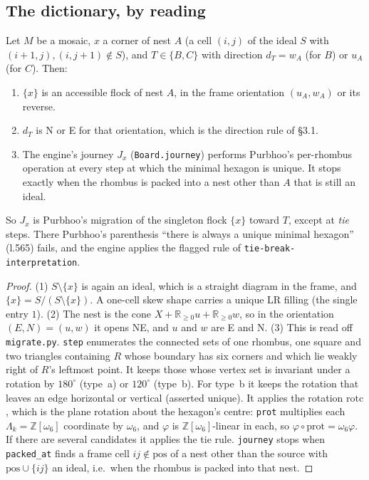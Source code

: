 \documentclass[11pt]{article}
\theoremstyle{definition}\newtheorem{definition}[theorem]{Definition}\newtheorem{remark}[theorem]{Remark}
\newcommand{\Z}{\mathbb Z}\newcommand{\R}{\mathbb R}
\begin{document}
\subsection{The dictionary, by reading}
\begin{lemma}[dictionary]\label{lem:dict}
Let $M$ be a mosaic, $x$ a corner of nest $A$ (a cell $(i,j)$ of the ideal $S$ with $(i+1,j),(i,j+1)\notin S$), and $T\in\{B,C\}$ with direction $d_T=w_A$ (for $B$) or $u_A$ (for $C$). Then:
\begin{enumerate}
\item $\{x\}$ is an accessible flock of nest $A$, in the frame orientation $(u_A,w_A)$ or its reverse.
\item $d_T$ is N or E for that orientation, which is the direction rule of \S3.1.
\item The engine's journey $J_x$ (\texttt{Board.journey}) performs Purbhoo's per-rhombus operation at every step at which the minimal hexagon is unique. It stops exactly when the rhombus is packed into a nest other than $A$ that is still an ideal.
\end{enumerate}
So $J_x$ is Purbhoo's migration of the singleton flock $\{x\}$ toward $T$, except at \emph{tie} steps. There Purbhoo's parenthesis ``there is always a unique minimal hexagon'' (l.565) fails, and the engine applies the flagged rule of \texttt{tie-break-interpretation}.
\end{lemma}
\begin{proof}
(1) $S\setminus\{x\}$ is again an ideal, which is a straight diagram in the frame, and $\{x\}=S/(S\setminus\{x\})$. A one-cell skew shape carries a unique LR filling (the single entry $1$). (2) The nest is the cone $X+\R_{\ge0}u+\R_{\ge0}w$, so in the orientation $(E,N)=(u,w)$ it opens NE, and $u$ and $w$ are E and N. (3) This is read off \texttt{migrate.py}. \texttt{step} enumerates the connected sets of one rhombus, one square and two triangles containing $R$ whose boundary has six corners and which lie weakly right of $R$'s leftmost point. It keeps those whose vertex set is invariant under a rotation by $180^\circ$ (type~a) or $120^\circ$ (type~b). For type~b it keeps the rotation that leaves an edge horizontal or vertical (asserted unique). It applies the rotation $\mathrm{rotc}$, which is the plane rotation about the hexagon's centre: \texttt{prot} multiplies each $\Lambda_k=\Z[\omega_6]$ coordinate by $\omega_6$, and $\varphi$ is $\Z[\omega_6]$-linear in each, so $\varphi\circ\mathrm{prot}=\omega_6\varphi$. If there are several candidates it applies the tie rule. \texttt{journey} stops when \texttt{packed\_at} finds a frame cell $ij\notin\mathrm{pos}$ of a nest other than the source with $\mathrm{pos}\cup\{ij\}$ an ideal, i.e.\ when the rhombus is packed into that nest.
\end{proof}
\end{document}
